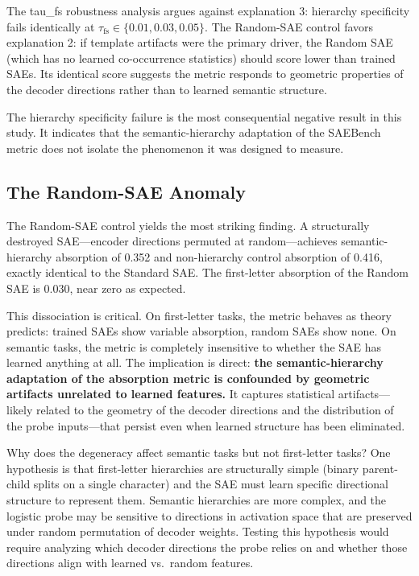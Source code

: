 \documentclass{article}
\begin{document}
The tau\_fs robustness analysis argues against explanation 3: hierarchy specificity fails identically at $\tau_{\text{fs}} \in \{0.01, 0.03, 0.05\}$. The Random-SAE control favors explanation 2: if template artifacts were the primary driver, the Random SAE (which has no learned co-occurrence statistics) should score lower than trained SAEs. Its identical score suggests the metric responds to geometric properties of the decoder directions rather than to learned semantic structure.

The hierarchy specificity failure is the most consequential negative result in this study. It indicates that the semantic-hierarchy adaptation of the SAEBench metric does not isolate the phenomenon it was designed to measure.

\subsection{The Random-SAE Anomaly}

The Random-SAE control yields the most striking finding. A structurally destroyed SAE---encoder directions permuted at random---achieves semantic-hierarchy absorption of 0.352 and non-hierarchy control absorption of 0.416, exactly identical to the Standard SAE. The first-letter absorption of the Random SAE is 0.030, near zero as expected.

This dissociation is critical. On first-letter tasks, the metric behaves as theory predicts: trained SAEs show variable absorption, random SAEs show none. On semantic tasks, the metric is completely insensitive to whether the SAE has learned anything at all. The implication is direct: \textbf{the semantic-hierarchy adaptation of the absorption metric is confounded by geometric artifacts unrelated to learned features.} It captures statistical artifacts---likely related to the geometry of the decoder directions and the distribution of the probe inputs---that persist even when learned structure has been eliminated.

Why does the degeneracy affect semantic tasks but not first-letter tasks? One hypothesis is that first-letter hierarchies are structurally simple (binary parent-child splits on a single character) and the SAE must learn specific directional structure to represent them. Semantic hierarchies are more complex, and the logistic probe may be sensitive to directions in activation space that are preserved under random permutation of decoder weights. Testing this hypothesis would require analyzing which decoder directions the probe relies on and whether those directions align with learned vs.~random features.
\end{document}
